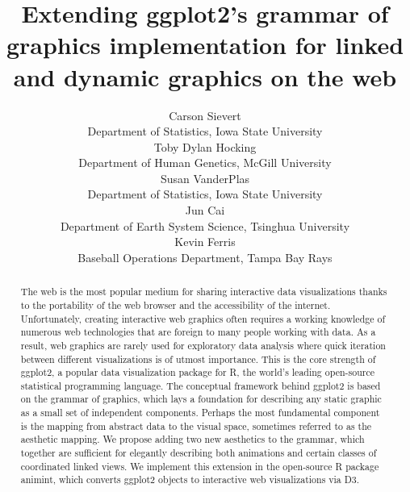 \documentclass[12pt,]{article}
\theoremstyle{definition}
\theoremstyle{definition}
\theoremstyle{remark}
\begin{document}
\def\spacingset#1{\renewcommand{\baselinestretch}%
{#1}\small\normalsize} \spacingset{1}

\title{\bf Extending ggplot2's grammar of graphics implementation for linked and
dynamic graphics on the web}
\author{
  Carson Sievert \\ 
  Department of Statistics, Iowa State University \\
  Toby Dylan Hocking \\ 
  Department of Human Genetics, McGill University \\
  Susan VanderPlas \\
  Department of Statistics, Iowa State University \\
  Jun Cai \\
  Department of Earth System Science, Tsinghua University\\
  Kevin Ferris \\
  Baseball Operations Department, Tampa Bay Rays
}
\maketitle

\bigskip
\begin{abstract}
The web is the most popular medium for sharing interactive data
visualizations thanks to the portability of the web browser and the
accessibility of the internet. Unfortunately, creating interactive web
graphics often requires a working knowledge of numerous web technologies
that are foreign to many people working with data. As a result, web
graphics are rarely used for exploratory data analysis where quick
iteration between different visualizations is of utmost importance. This
is the core strength of ggplot2, a popular data visualization package
for R, the world's leading open-source statistical programming language.
The conceptual framework behind ggplot2 is based on the grammar of
graphics, which lays a foundation for describing any static graphic as a
small set of independent components. Perhaps the most fundamental
component is the mapping from abstract data to the visual space,
sometimes referred to as the aesthetic mapping. We propose adding two
new aesthetics to the grammar, which together are sufficient for
elegantly describing both animations and certain classes of coordinated
linked views. We implement this extension in the open-source R package
animint, which converts ggplot2 objects to interactive web
visualizations via D3.
\end{abstract}
\end{document}
